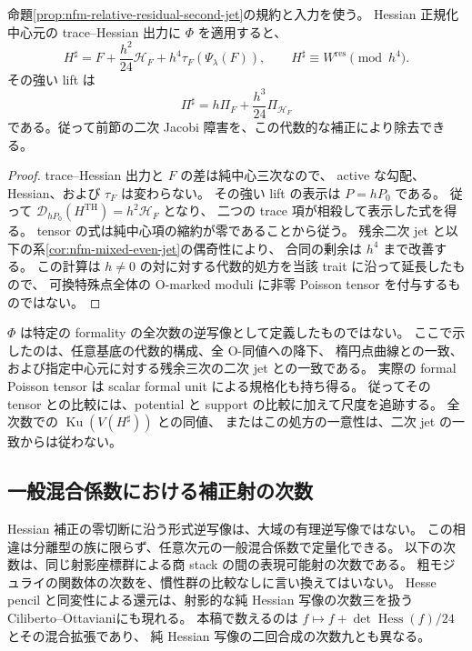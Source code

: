 \begin{corollary}
\label{cor:nfm-corrected-residual-jet}
命題\ref{prop:nfm-relative-residual-second-jet}の規約と入力を使う。
Hessian 正規化中心元の trace--Hessian 出力に $\Phi$ を適用すると、
\[
 H^\sharp
 =F+\frac{h^2}{24}\mathscr H_F+h^4\tau_F(\Psi_\lambda(F)),
 \qquad H^\sharp\equiv W^{\mathrm{res}}\pmod{h^4}.
\]
その強い lift は
\[
 \Pi^\sharp=h\Pi_F+\frac{h^3}{24}\Pi_{\mathscr H_F}
\]
である。従って前節の二次 Jacobi 障害を、この代数的な補正により除去できる。
\end{corollary}
\begin{proof}
trace--Hessian 出力と $F$ の差は純中心三次なので、
active な勾配、Hessian、および $\tau_F$ は変わらない。
その強い lift の表示は $P=hP_0$ である。
従って $\mathcal D_{hP_0}(H^{\mathrm{TH}})=h^2\mathscr H_F$ となり、
二つの trace 項が相殺して表示した式を得る。
tensor の式は純中心項の縮約が零であることから従う。
残余二次 jet と以下の系\ref{cor:nfm-mixed-even-jet}の偶奇性により、
合同の剰余は $h^4$ まで改善する。
この計算は $h\ne0$ の対に対する代数的処方を当該 trait に沿って延長したもので、
可換特殊点全体の O-marked moduli に非零 Poisson tensor を付与するものではない。
\end{proof}

\begin{remark}[残る比較問題]
$\Phi$ は特定の formality の全次数の逆写像として定義したものではない。
ここで示したのは、任意基底の代数的構成、全 O-同値への降下、
楕円点曲線との一致、および指定中心元に対する残余三次の二次 jet との一致である。
実際の formal Poisson tensor は scalar formal unit による規格化も持ち得る。
従ってその tensor との比較には、potential と support の比較に加えて尺度を追跡する。
全次数での $\operatorname{Ku}(V(H^\sharp))$ との同値、
またはこの処方の一意性は、二次 jet の一致からは従わない。
\end{remark}

\subsection{一般混合係数における補正射の次数}
\label{sec:nfm-correction-degree}

Hessian 補正の零切断に沿う形式逆写像は、大域の有理逆写像ではない。
この相違は分離型の族に限らず、任意次元の一般混合係数で定量化できる。
以下の次数は、同じ射影座標群による商 stack の間の表現可能射の次数である。
粗モジュライの関数体の次数を、慣性群の比較なしに言い換えてはいない。
Hesse pencil と同変性による還元は、射影的な純 Hessian 写像の次数三を扱う
Ciliberto--Ottaviani\cite[Section~5, Theorem~5.7]{NFMCilibertoOttaviani}にも現れる。
本稿で数えるのは $f\mapsto f+\det\operatorname{Hess}(f)/24$ とその混合拡張であり、
純 Hessian 写像の二回合成の次数九とも異なる。

